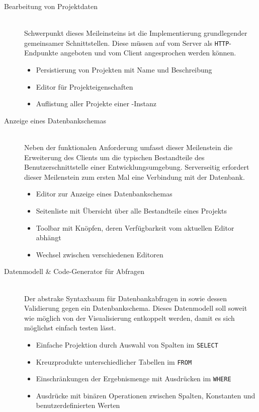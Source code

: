\begin{description}
\item[Bearbeitung von Projektdaten] \hfill \\
  Schwerpunkt dieses Meileinsteins ist die Implementierung grundlegender gemeinsamer Schnittstellen. Diese müssen auf vom Server als \texttt{HTTP}-Endpunkte angeboten und vom Client angesprochen werden können.
  \begin{itemize}[noitemsep]
  \item Persistierung von Projekten mit Name und Beschreibung
  \item Editor für Projekteigenschaften
  \item Auflistung aller Projekte einer \idename{}-Instanz
  \end{itemize}
\item [Anzeige eines Datenbankschemas] \hfill \\
  Neben der funktionalen Anforderung umfasst dieser Meilenstein die Erweiterung des Clients um die typischen Bestandteile des Benutzerschnittstelle einer Entwicklungsumgebung. Serverseitig erfordert dieser Meilenstein zum ersten Mal eine Verbindung mit der Datenbank.
  \begin{itemize}[noitemsep]
  \item Editor zur Anzeige eines Datenbankschemas
  \item Seitenliste mit Übersicht über alle Bestandteile eines Projekts
  \item Toolbar mit Knöpfen, deren Verfügbarkeit vom aktuellen Editor abhängt
  \item Wechsel zwischen verschiedenen Editoren
  \end{itemize}
\item [Datenmodell \& Code-Generator für Abfragen] \hfill \\
  Der abstrake Syntaxbaum für Datenbankabfragen in \idename{} sowie dessen Validierung gegen ein Datenbankschema. Dieses Datenmodell soll soweit wie möglich von der Visualisierung entkoppelt werden, damit es sich möglichst einfach testen lässt.
  \begin{itemize}[noitemsep]
  \item Einfache Projektion durch Auswahl von Spalten im \texttt{SELECT}
  \item Kreuzprodukte unterschiedlicher Tabellen im \texttt{FROM}
  \item Einschränkungen der Ergebnismenge mit Ausdrücken im \texttt{WHERE}
  \item Ausdrücke mit binären Operationen zwischen Spalten, Konstanten und benutzerdefinierten Werten

\end{itemize}
\end{description}
